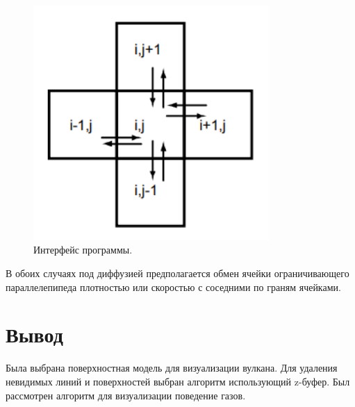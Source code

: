 \begin{figure}[H]
	\centering
	\includegraphics[width=0.8\textwidth, page=1]{assets/img/diffusion.png}   
	\caption{Интерфейс программы.}
	\label{fig:diffusion}
\end{figure}

В обоих случаях под диффузией предполагается обмен ячейки ограничивающего параллелепипеда плотностью или скоростью с соседними по граням ячейками.  

\section*{Вывод}
Была выбрана поверхностная модель для визуализации вулкана. Для удаления невидимых линий и поверхностей выбран алгоритм использующий z-буфер. Был рассмотрен алгоритм для визуализации поведение газов.
